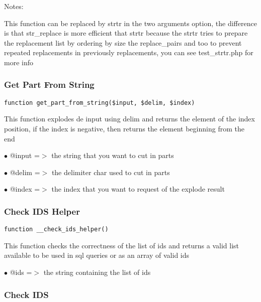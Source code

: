 \documentclass[a4paper]{article}
\begin{document}
Notes:

This function can be replaced by strtr in the two arguments option, the
difference is that str\_replace is more efficient that strtr because the
strtr tries to prepare the replacement list by ordering by size the
replace\_pairs and too to prevent repeated replacements in previously
replacements, you can see test\_strtr.php for more info

\hypertarget{toc249}{}
\subsubsection{Get Part From String}

\begin{lstlisting}
function get_part_from_string($input, $delim, $index)
\end{lstlisting}

This function explodes de input using delim and returns the element of the
index position, if the index is negative, then returns the element beginning
from the end

\begin{compactitem}
\item[\color{myblue}$\bullet$] @input =$>$ the string that you want to cut in parts
\item[\color{myblue}$\bullet$] @delim =$>$ the delimiter char used to cut in parts
\item[\color{myblue}$\bullet$] @index =$>$ the index that you want to request of the explode result
\end{compactitem}

\hypertarget{toc250}{}
\subsubsection{Check IDS Helper}

\begin{lstlisting}
function __check_ids_helper()
\end{lstlisting}

This function checks the correctness of the list of ids and returns a valid
list available to be used in sql queries or as an array of valid ids

\begin{compactitem}
\item[\color{myblue}$\bullet$] @ids =$>$ the string containing the list of ids
\end{compactitem}

\hypertarget{toc251}{}
\subsubsection{Check IDS}
\end{document}
